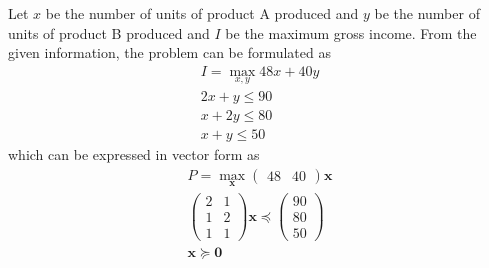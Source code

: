 \documentclass[journal,12pt,twocolumn]{IEEEtran}
\newcommand{\myvec}[1]{\ensuremath{\begin{pmatrix}#1\end{pmatrix}}}
\let\vec\mathbf
\begin{document}
Let $x$ be the number of units of product A produced and $y$ be the number of units of product B produced and $I$ be the maximum gross income.
From the given information, the problem can be formulated as
\begin{align}
    I = \max_{x,y} 48x + 40y
    \\
    2x + y \le 90 
    \\
    x + 2y \le 80 
    \\
    x + y \le 50 
\end{align}
which can be expressed in vector form as
\begin{align}
    P = \max_{\vec{x}}\myvec{48 & 40}\vec{x}
    \\
    \myvec{2 & 1 \\ 1 & 2 \\ 1 & 1} \vec{x} \preceq \myvec{90 \\ 80 \\ 50}
    \\
    \vec{x} \succeq \vec{0}
\end{align}
\end{document}
